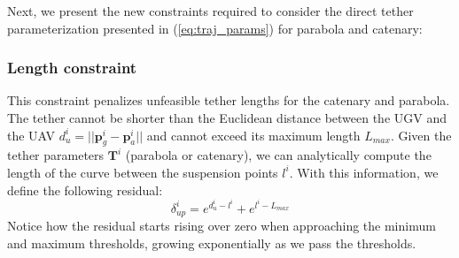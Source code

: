 Next, we present the new constraints required to consider the direct tether parameterization presented in (\ref{eq:traj_params}) for parabola and catenary:





\subsubsection{Length constraint}
This constraint penalizes unfeasible tether lengths for the catenary and parabola. The tether cannot be shorter than the Euclidean distance between the UGV and the UAV $d^i_u=||\mathbf{p}^i_g-\mathbf{p}^i_a||$ and cannot exceed its maximum length $L_{max}$. Given the tether parameters $\mathbf{T}^i$ (parabola or catenary), we can analytically compute the length of the curve between the suspension points $l^i$. With this information, we define the following residual:
\begin{equation}
    \label{eq:eq_length}
    \delta^i_{up} =   e^{d^i_{u} - l^{i}} + e^{l^{i} - L_{max}} 
\end{equation}
\noindent Notice how the residual starts rising over zero when approaching the minimum and maximum thresholds, growing exponentially as we pass the thresholds.

